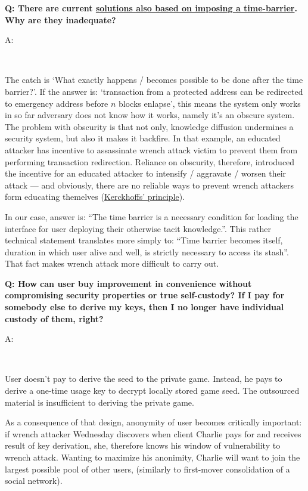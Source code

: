 \documentclass[12pt,a4paper]{article}
\newenvironment{question}[1]{%
  \vspace{0.8em}\noindent\textbf{Q: #1}\par
  \vspace{0.2em}\noindent\begin{itshape}A:\end{itshape}~%
}{\vspace{0.8em}}
\newcommand{\kprinciple}{https://en.wikipedia.org/wiki/Kerckhoffs's_principle}
\begin{document}
\begin{question}{There are current \href{https://rewindbitcoin.com/}{solutions also based on imposing a time-barrier}. Why are they inadequate?}
The catch is `What exactly happens / becomes possible to be done after the time barrier?'. If the answer is: `transaction from a protected address can be redirected to emergency address before $n$ blocks enlapse', this means the system only works in so far adversary does not know how it works, namely it's an obscure system. The problem with obscurity is that not only, knowledge diffusion undermines a security system, but also it makes it backfire. In that example, an educated attacker has incentive to assassinate wrench attack victim to prevent them from performing transaction redirection. Reliance on obscurity, therefore, introduced the incentive for an educated attacker to intensify / aggravate / worsen their attack --- and obviously, there are no reliable ways to prevent wrench attackers form educating themelves (\href{\kprinciple}{Kerckhoffs' principle}).

In our case, answer is: ``The time barrier is a necessary condition for loading the interface for user deploying their otherwise tacit knowledge.''. This rather technical statement translates more simply to: ``Time barrier becomes itself, duration in which user alive and well, is strictly necessary to access its stash''. That fact makes wrench attack more difficult to carry out.
\end{question}

\begin{question}{How can user buy improvement in convenience without compromising security properties or true self-custody? If I pay for somebody else to derive my keys, then I no longer have individual custody of them, right?}
User doesn't pay to derive the seed to the private game. Instead, he pays to derive a one-time usage key to decrypt locally stored game seed. The outsourced material is insufficient to deriving the private game.

As a consequence of that design, anonymity of user becomes critically important: if wrench attacker Wednesday discovers when client Charlie pays for and receives result of key derivation, she, therefore knows his window of vulnerability to wrench attack. Wanting to maximize his anonimity, Charlie will want to join the largest possible pool of other users, (similarly to first-mover consolidation of a social network).
\end{question}
\end{document}

